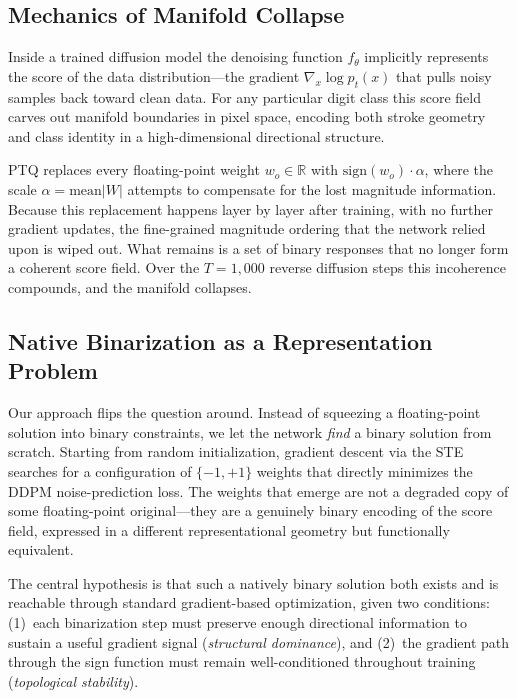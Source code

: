 \documentclass[twocolumn, journal]{IEEEtran}
\begin{document}
\subsection{Mechanics of Manifold Collapse}

Inside a trained diffusion model the denoising function $f_\theta$ implicitly represents
the score of the data distribution---the gradient $\nabla_x \log p_t(x)$ that pulls
noisy samples back toward clean data. For any particular digit class this score field
carves out manifold boundaries in pixel space, encoding both stroke geometry and class
identity in a high-dimensional directional structure.

PTQ replaces every floating-point weight $w_o \in \mathbb{R}$ with
$\text{sign}(w_o)\cdot\alpha$, where the scale
$\alpha = \text{mean}|W|$ attempts to compensate for the lost magnitude information.
Because this replacement happens layer by layer after training, with no further gradient
updates, the fine-grained magnitude ordering that the network relied upon is wiped out.
What remains is a set of binary responses that no longer form a coherent score field.
Over the $T=1{,}000$ reverse diffusion steps this incoherence compounds, and the
manifold collapses.

\subsection{Native Binarization as a Representation Problem}

Our approach flips the question around. Instead of squeezing a floating-point solution
into binary constraints, we let the network \emph{find} a binary solution from scratch.
Starting from random initialization, gradient descent via the STE searches for a
configuration of $\{-1,+1\}$ weights that directly minimizes the DDPM noise-prediction
loss. The weights that emerge are not a degraded copy of some floating-point
original---they are a genuinely binary encoding of the score field, expressed in a
different representational geometry but functionally equivalent.

The central hypothesis is that such a natively binary solution both exists and is
reachable through standard gradient-based optimization, given two conditions:
(1)~each binarization step must preserve enough directional information to sustain a
useful gradient signal (\emph{structural dominance}), and (2)~the gradient path through
the sign function must remain well-conditioned throughout training (\emph{topological
stability}).
\end{document}
